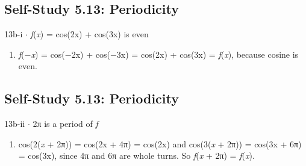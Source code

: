 \documentclass[11pt]{article}
\begin{document}
\begin{keepsection}\subsection{Self-Study 5.13: Periodicity}

\begin{workedbox}{13b-i \ensuremath{\cdot} \textit{f}(\textit{x}) = cos(2x) + cos(3x) is even}
\begin{enumerate}
\item \textit{f}(\ensuremath{-}\textit{x}) = cos(\ensuremath{-}2x) + cos(\ensuremath{-}3x) = cos(2x) + cos(3x) = \textit{f}(\textit{x}), because cosine is even.
\end{enumerate}
\end{workedbox}

\end{keepsection}
\begin{keepsection}\subsection{Self-Study 5.13: Periodicity}

\begin{workedbox}{13b-ii \ensuremath{\cdot} 2π is a period of \textit{f}}
\begin{enumerate}
\item cos(2(\textit{x} + 2π)) = cos(2x + 4π) = cos(2x) and cos(3(\textit{x} + 2π)) = cos(3x + 6π) = cos(3x), since 4π and 6π are whole turns. So \textit{f}(\textit{x} + 2π) = \textit{f}(\textit{x}).
\end{enumerate}
\end{workedbox}

\end{keepsection}
\end{document}
